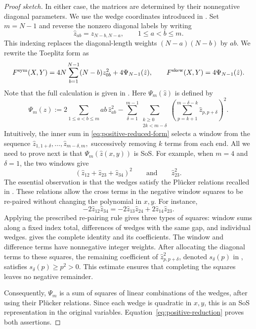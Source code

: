 \begin{proof}[Proof sketch]

In either case, the matrices are determined by their nonnegative
diagonal parameters. We use the wedge coordinates introduced in
. Set $m=N-1$ and reverse the nonzero
diagonal labels by writing
\[
 \hat z_{ab}=z_{N-b,N-a},
 \qquad 1\le a<b\le m.
\]
This indexing replaces the diagonal-length weights
$(N-a)(N-b)$ by $ab$.
We rewrite the Toeplitz form as
\begin{equation}\label{eq:positive-reduction}
 \begin{aligned}
 F^{\rm sym}(X,Y)
 =
 4N\sum_{b=1}^{N-1}(N-b)z_{0b}^2
 +4\Psi_{N-1}(\hat z),\qquad
 F^{\rm skew}(X,Y)
 =4\Psi_{N-1}(\hat z).
 \end{aligned}
\end{equation}
Note that the full calculation is given in
.
Here $\Psi_m(\hat z)$ is defined by
\begin{equation}\label{eq:positive-reduced-form}
 \Psi_m(\hat z)
 :=
 2\sum_{1\le a<b\le m}ab\,\hat z_{ab}^2
 -
 \sum_{\delta=1}^{m-1}
 \sum_{\substack{k\ge0\\2k<m-\delta}}
 \left(
   \sum_{p=k+1}^{m-\delta-k}\hat z_{p,p+\delta}
 \right)^2.
\end{equation}
Intuitively, the inner sum in
\eqref{eq:positive-reduced-form} selects a window from the sequence
$
\hat z_{1,1+\delta},\ldots,\hat z_{m-\delta,m},
$
successively removing $k$ terms from each end. 
All we need to prove next is that
$\Psi_m(\hat z(x,y))$ is SoS. For example, when $m=4$ and $\delta=1$,
the two windows give
\[
 (\hat z_{12}+\hat z_{23}+\hat z_{34})^2
 \qquad\text{and}\qquad
 \hat z_{23}^2.
\]
The essential observation is that the wedges satisfy the Pl\"ucker
relations recalled in . These relations
allow the cross terms in the negative window squares to be re-paired
without changing the polynomial in $x,y$. For instance,
\[
 -2\hat z_{12}\hat z_{34}
 =
 -2\hat z_{13}\hat z_{24}
 +2\hat z_{14}\hat z_{23}.
\]
Applying the prescribed re-pairing rule gives three types of
squares: window sums along a fixed index total, differences of
wedges with the same gap, and individual wedges.
 gives the
complete identity and its coefficients. The window and
difference terms have nonnegative integer weights.
After allocating the diagonal terms to these squares, the
remaining coefficient of $\hat z_{p,p+\delta}^2$, denoted
$s_\delta(p)$ in , satisfies
$
 s_\delta(p)\ge p^2>0.
$
This estimate ensures that completing the squares leaves no
negative remainder.

Consequently, $\Psi_m$ is a sum of squares of linear combinations
of the wedges, after using their Pl\"ucker relations.
Since each wedge is quadratic in $x,y$, this is an SoS
representation in the original variables.
Equation~\eqref{eq:positive-reduction} proves both assertions.
\end{proof}


